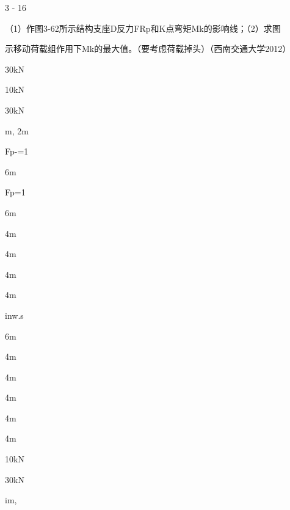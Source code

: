 3 - 16

（1）作图3-62所示结构支座D反力FRp和K点弯矩Mk的影响线；（2）求图

示移动荷载组作用下Mk的最大值。（要考虑荷载掉头）（西南交通大学2012）

30kN

10kN

30kN

m, 2m

Fp-=1

6m

Fp=1

6m

4m

4m

4m

4m

inw.s

6m

4m

4m

4m

4m

4m

10kN

30kN

im,

